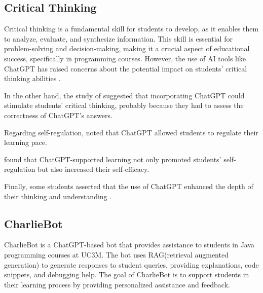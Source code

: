 \documentclass[conference]{IEEEtran}
\begin{document}
\subsection{Critical Thinking}

Critical thinking is a fundamental skill for students to develop, as it enables
them to analyze, evaluate, and synthesize information. This skill is essential
for problem-solving and decision-making, making it a crucial aspect of
educational success, specifically in programming courses. However, the use of AI
tools like ChatGPT has raised concerns about the potential impact on students'
critical thinking abilities \cite{Vargas2023} \cite{cai23} \cite{chan23}.

In the other hand, the study of \cite{zhang24} suggested that incorporating
ChatGPT could stimulate students' critical thinking, probably because they
had to assess the correctness of ChatGPT's answers.

Regarding self-regulation, \cite{cai23} noted that ChatGPT allowed students to
regulate their learning pace.

\cite{wu24} found that ChatGPT-supported learning not only promoted students'
self-regulation but also increased their self-efficacy.

Finally, some students asserted that the use of ChatGPT enhanced the depth of
their thinking and understanding \cite{chan23}.

\subsection{CharlieBot}

CharlieBot is a ChatGPT-based bot that provides assistance to students in Java
programming courses at UC3M. The bot uses RAG(retrieval augmented generation) to
generate responses to student queries, providing explanations, code snippets,
and debugging help. The goal of CharlieBot is to support students in their
learning process by providing personalized assistance and feedback.
\end{document}
